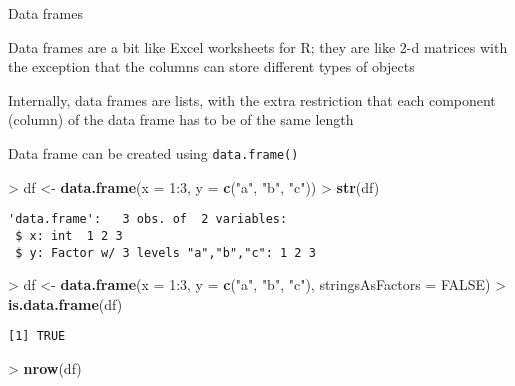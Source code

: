 \documentclass[10pt,ignorenonframetext,compress, aspectratio=169]{beamer}
\newenvironment{Shaded}{\begin{snugshade}}{\end{snugshade}}
\newcommand{\KeywordTok}[1]{\textcolor[rgb]{0.13,0.29,0.53}{\textbf{{#1}}}}
\newcommand{\DataTypeTok}[1]{\textcolor[rgb]{0.13,0.29,0.53}{{#1}}}
\newcommand{\DecValTok}[1]{\textcolor[rgb]{0.00,0.00,0.81}{{#1}}}
\newcommand{\StringTok}[1]{\textcolor[rgb]{0.31,0.60,0.02}{{#1}}}
\newcommand{\OtherTok}[1]{\textcolor[rgb]{0.56,0.35,0.01}{{#1}}}
\newcommand{\NormalTok}[1]{{#1}}
\begin{document}
\begin{frame}[fragile]{Data frames}

Data frames are a bit like Excel worksheets for R; they are like 2-d
matrices with the exception that the columns can store different types
of objects

Internally, data frames are lists, with the extra restriction that each
component (column) of the data frame has to be of the same length

Data frame can be created using \texttt{data.frame()}

\begin{Shaded}
\begin{Highlighting}[]
\NormalTok{>}\StringTok{ }\NormalTok{df <-}\StringTok{ }\KeywordTok{data.frame}\NormalTok{(}\DataTypeTok{x =} \DecValTok{1}\NormalTok{:}\DecValTok{3}\NormalTok{, }\DataTypeTok{y =} \KeywordTok{c}\NormalTok{(}\StringTok{"a"}\NormalTok{, }\StringTok{"b"}\NormalTok{, }\StringTok{"c"}\NormalTok{))}
\NormalTok{>}\StringTok{ }\KeywordTok{str}\NormalTok{(df)}
\end{Highlighting}
\end{Shaded}

\begin{verbatim}
'data.frame':   3 obs. of  2 variables:
 $ x: int  1 2 3
 $ y: Factor w/ 3 levels "a","b","c": 1 2 3
\end{verbatim}

\begin{Shaded}
\begin{Highlighting}[]
\NormalTok{>}\StringTok{ }\NormalTok{df <-}\StringTok{ }\KeywordTok{data.frame}\NormalTok{(}\DataTypeTok{x =} \DecValTok{1}\NormalTok{:}\DecValTok{3}\NormalTok{, }\DataTypeTok{y =} \KeywordTok{c}\NormalTok{(}\StringTok{"a"}\NormalTok{, }\StringTok{"b"}\NormalTok{, }\StringTok{"c"}\NormalTok{), }\DataTypeTok{stringsAsFactors =} \OtherTok{FALSE}\NormalTok{)}
\NormalTok{>}\StringTok{ }\KeywordTok{is.data.frame}\NormalTok{(df)}
\end{Highlighting}
\end{Shaded}

\begin{verbatim}
[1] TRUE
\end{verbatim}

\begin{Shaded}
\begin{Highlighting}[]
\NormalTok{>}\StringTok{ }\KeywordTok{nrow}\NormalTok{(df)}
\end{Highlighting}
\end{Shaded}


\end{frame}
\end{document}
